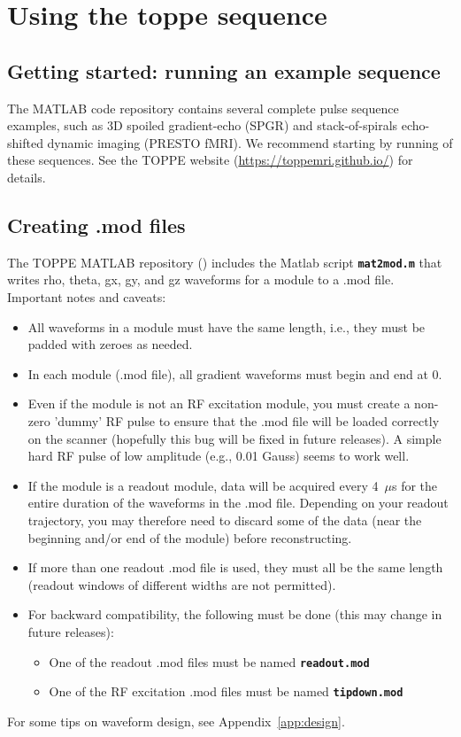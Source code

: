 
\chapter{Using the toppe sequence}

\section{Getting started: running an example sequence}

The MATLAB code repository contains several complete pulse sequence examples, such as 3D spoiled gradient-echo (SPGR) and stack-of-spirals echo-shifted dynamic imaging (PRESTO fMRI). 
We recommend starting by running of these sequences.
See the TOPPE website (\url{https://toppemri.github.io/}) for details.



\section{Creating .mod files}
\label{sec:cmf}
The TOPPE MATLAB repository (\matrep) includes the Matlab script {\tt \bf mat2mod.m} that writes rho, theta, gx, gy, and gz waveforms for a module to a .mod file.
Important notes and caveats:
\begin{itemize}
	\item All waveforms in a module must have the same length, i.e., they must be padded with zeroes as needed.
	\item In each module (.mod file), all gradient waveforms must begin and end at 0.
	\item Even if the module is not an RF excitation module, you must create a non-zero 'dummy' RF pulse to ensure that the .mod file will be loaded correctly on the scanner (hopefully this bug will be fixed in future releases). A simple hard RF pulse of low amplitude (e.g., 0.01 Gauss) seems to work well.
	\item If the module is a readout module, data will be acquired every 4~$\mu$s for the entire duration of the waveforms in the .mod file. Depending on your readout trajectory, you may therefore need to discard some of the data (near the beginning and/or end of the module) before reconstructing.
	\item If more than one readout .mod file is used, they must all be the same length (readout windows of different widths are not permitted).
	\item For backward compatibility, the following must be done (this may change in future releases):
	\begin{itemize}
		\item One of the readout .mod files must be named {\tt \bf readout.mod} 
		\item One of the RF excitation .mod files must be named {\tt \bf tipdown.mod} 
	\end{itemize}
\end{itemize}
For some tips on waveform design, see Appendix~\ref{app:design}.



